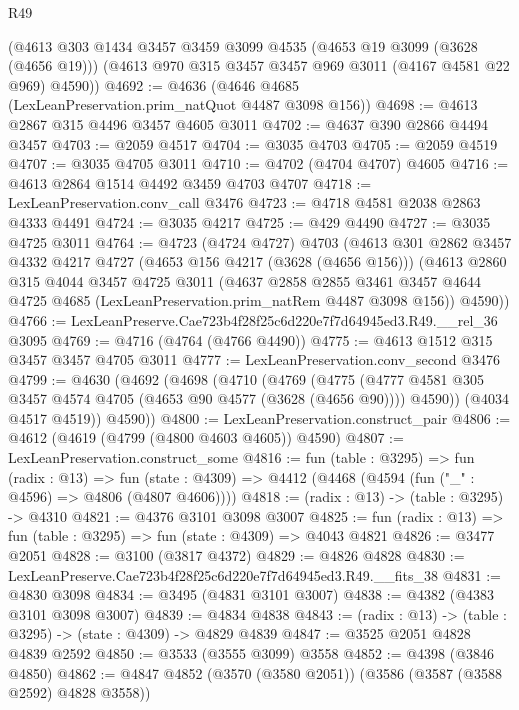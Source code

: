 \begin{lexlean}{R49}
\begin{coremodule}
    (@4613
      @303
      @1434
      @3457
      @3459
      @3099
      @4535
      (@4653 @19 @3099 (@3628 (@4656 @19)))
      (@4613 @970 @315 @3457 @3457 @969 @3011 (@4167 @4581 @22 @969) @4590))
@4692 := @4636 (@4646 @4685 (LexLeanPreservation.prim_natQuot @4487 @3098 @156))
@4698 := @4613 @2867 @315 @4496 @3457 @4605 @3011
@4702 := @4637 @390 @2866 @4494 @3457
@4703 := @2059 @4517
@4704 := @3035 @4703
@4705 := @2059 @4519
@4707 := @3035 @4705 @3011
@4710 := @4702 (@4704 @4707) @4605
@4716 := @4613 @2864 @1514 @4492 @3459 @4703 @4707
@4718 := LexLeanPreservation.conv_call @3476
@4723 := @4718 @4581 @2038 @2863 @4333 @4491
@4724 := @3035 @4217
@4725 := @429 @4490
@4727 := @3035 @4725 @3011
@4764 := @4723
    (@4724 @4727)
    @4703
    (@4613
      @301
      @2862
      @3457
      @4332
      @4217
      @4727
      (@4653 @156 @4217 (@3628 (@4656 @156)))
      (@4613
        @2860
        @315
        @4044
        @3457
        @4725
        @3011
        (@4637
          @2858
          @2855
          @3461
          @3457
          @4644
          @4725
          @4685
          (LexLeanPreservation.prim_natRem @4487 @3098 @156))
        @4590))
@4766 := LexLeanPreserve.Cae723b4f28f25c6d220e7f7d64945ed3.R49.__rel_36 @3095
@4769 := @4716 (@4764 (@4766 @4490))
@4775 := @4613 @1512 @315 @3457 @3457 @4705 @3011
@4777 := LexLeanPreservation.conv_second @3476
@4799 := @4630
    (@4692
      (@4698
        (@4710
          (@4769
            (@4775
              (@4777 @4581 @305 @3457 @4574 @4705 (@4653 @90 @4577 (@3628 (@4656 @90))))
              @4590))
          (@4034 @4517 @4519))
        @4590))
@4800 := LexLeanPreservation.construct_pair
@4806 := @4612 (@4619 (@4799 (@4800 @4603 @4605)) @4590)
@4807 := LexLeanPreservation.construct_some
@4816 := fun (table : @3295) =>
  fun (radix : @13) =>
  fun (state : @4309) => @4412 (@4468 (@4594 (fun ("_" : @4596) => @4806 (@4807 @4606))))
@4818 := (radix : @13) -> (table : @3295) -> @4310
@4821 := @4376 @3101 @3098 @3007
@4825 := fun (radix : @13) => fun (table : @3295) => fun (state : @4309) => @4043 @4821
@4826 := @3477 @2051
@4828 := @3100 (@3817 @4372)
@4829 := @4826 @4828
@4830 := LexLeanPreserve.Cae723b4f28f25c6d220e7f7d64945ed3.R49.__fits_38
@4831 := @4830 @3098
@4834 := @3495 (@4831 @3101 @3007)
@4838 := @4382 (@4383 @3101 @3098 @3007)
@4839 := @4834 @4838
@4843 := (radix : @13) -> (table : @3295) -> (state : @4309) -> @4829 @4839
@4847 := @3525 @2051 @4828 @4839 @2592
@4850 := @3533 (@3555 @3099) @3558
@4852 := @4398 (@3846 @4850)
@4862 := @4847 @4852 (@3570 (@3580 @2051)) (@3586 (@3587 (@3588 @2592) @4828 @3558))

\end{coremodule}
\end{lexlean}
